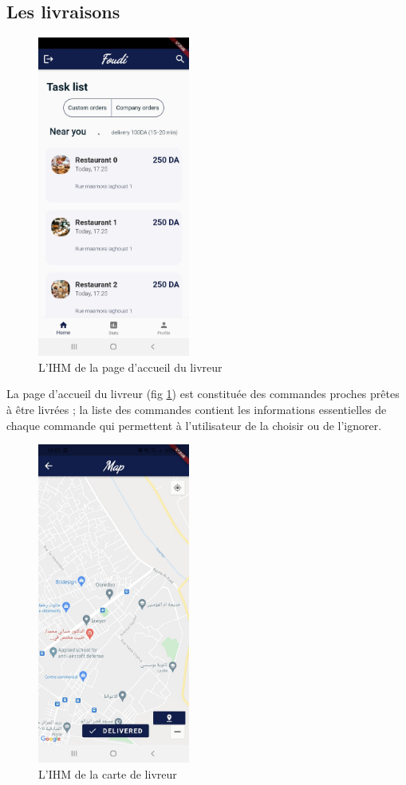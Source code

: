\documentclass[french, a4paper, 12pt]{report}
\begin{document}
		\subsection{Les livraisons} 
		\begin{figure}[h!]
			\center
			\includegraphics[width=5cm]{screenshots/DeliveryViews/Homepage(list of orders).jpg}
			\caption{L'IHM de la page d'accueil du livreur}
			\label{fig:delihp}
		\end{figure}
		La page d'accueil du livreur (fig \ref{fig:delihp}) est constituée des commandes proches prêtes à être livrées ; la liste des commandes contient les informations essentielles de chaque commande qui permettent à l'utilisateur de la choisir ou de l'ignorer.
		\newpage
		\begin{figure}[h!]
			\center
			\includegraphics[width=5cm]{screenshots/DeliveryViews/ClientPositionMap.jpg}
			\caption{L'IHM de la carte de livreur}
			\label{fig:delimp}
		\end{figure}
		
\end{document}
